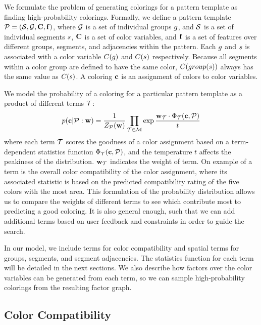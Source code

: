 We formulate the problem of generating colorings for a pattern template as finding high-probability colorings. Formally, we define a pattern template $\mathcal{P} = (\mathcal{S}, \mathcal{G}, \mathbf{C}, \mathbf{f})$, where $\mathcal{G}$ is a set of individual groups $g$, and $\mathcal{S}$ is a set of individual segments $s$, $\mathbf{C}$ is a set of color variables, and $\mathbf{f}$ is a set of features over different groups, segments, and adjacencies within the pattern. Each $g$ and $s$ is associated with a color variable $C(g)$ and $C(s)$ respectively. Because all segments within a color group are defined to have the same color, $C(group(s))$ always has the same value as $C(s)$. A coloring $\mathbf{c}$ is an assignment of colors to color variables.

We model the probability of a coloring for a particular pattern template as a product of different terms $\mathcal{T}$:   
\begin{equation*}
 p(\mathbf{c} | \mathcal{P} : \mathbf{w}) = \frac{1}{Z_{\mathcal{P}}(\mathbf{w})} \prod_{\mathcal{T} \in \mathcal{M}} \exp{\frac{ \mathbf{w}_{\mathcal{T}}\cdot \Phi_{\mathcal{T}}(\mathbf{c}, \mathcal{P})}{t}}
\end{equation*}
where each term $\mathcal{T}$ scores the goodness of a color assignment based on a term-dependent statistics function $\Phi_{\mathcal{T}}(\mathbf{c},\mathcal{P})$, and the temperature $t$ affects the peakiness of the distribution. $\mathbf{w}_{\mathcal{T}}$ indicates the weight of term. On example of a term is the overall color compatibility of the color assignment, where its associated statistic is based on the predicted compatibility rating of the five colors with the most area. This formulation of the probability distribution allows us to compare the weights of different terms to see which contribute most to predicting a good coloring. It is also general enough, such that we can add additional terms based on user feedback and constraints in order to guide the search.

In our model, we include terms for color compatibility and spatial terms for groups, segments, and segment adjacencies. The statistics function for each term will be detailed in the next sections. We also describe how factors over the color variables can be generated from each term, so we can sample high-probability colorings from the resulting factor graph.

\subsection{Color Compatibility}
\label{sec:colorCompat}

